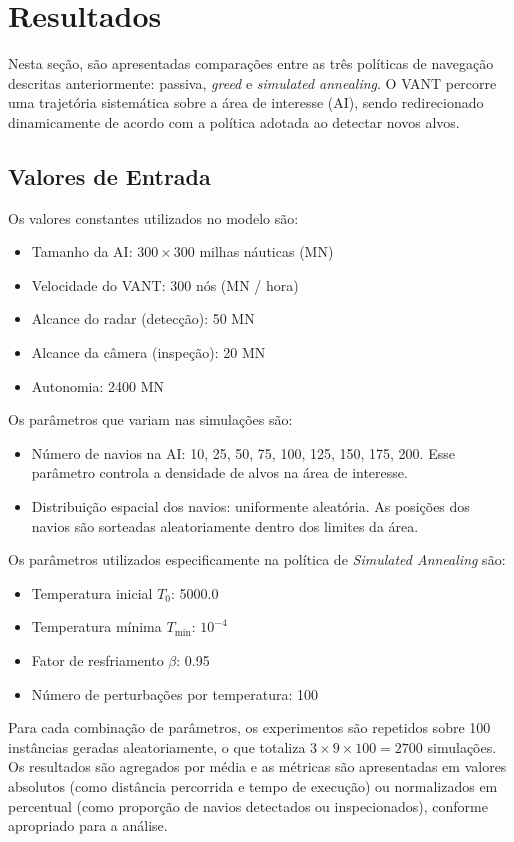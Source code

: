 \section{Resultados}

Nesta seção, são apresentadas comparações entre as três políticas de navegação descritas anteriormente: passiva, \textit{greed} e \textit{simulated annealing}. O VANT percorre uma trajetória sistemática sobre a área de interesse (AI), sendo redirecionado dinamicamente de acordo com a política adotada ao detectar novos alvos.

\subsection{Valores de Entrada}

Os valores constantes utilizados no modelo são:

\begin{itemize}
    \item Tamanho da AI: $300 \times 300$ milhas náuticas (MN)
    \item Velocidade do VANT: 300 nós (MN / hora)
    \item Alcance do radar (detecção): 50 MN
    \item Alcance da câmera (inspeção): 20 MN
    \item Autonomia: 2400 MN
\end{itemize}

Os parâmetros que variam nas simulações são:

\begin{itemize}
    \item Número de navios na AI: 10, 25, 50, 75, 100, 125, 150, 175, 200. Esse parâmetro controla a densidade de alvos na área de interesse.
    
    \item Distribuição espacial dos navios: uniformente aleatória. As posições dos navios são sorteadas aleatoriamente dentro dos limites da área.
\end{itemize}

Os parâmetros utilizados especificamente na política de \textit{Simulated Annealing} são:

\begin{itemize}
    \item Temperatura inicial $T_0$: 5000.0
    \item Temperatura mínima $T_{\text{min}}$: $10^{-4}$
    \item Fator de resfriamento $\beta$: 0.95
    \item Número de perturbações por temperatura: 100
\end{itemize}

Para cada combinação de parâmetros, os experimentos são repetidos sobre 100 instâncias geradas aleatoriamente, o que totaliza $3 \times 9 \times 100 = 2700$ simulações. Os resultados são agregados por média e as métricas são apresentadas em valores absolutos (como distância percorrida e tempo de execução) ou normalizados em percentual (como proporção de navios detectados ou inspecionados), conforme apropriado para a análise.


